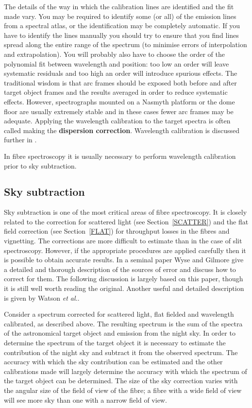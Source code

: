 \documentclass[twoside,11pt]{starlink}
\begin{document}
The details of the way in which the calibration lines are identified
and the fit made vary.  You may be required to identify some (or all)
of the emission lines from a spectral atlas, or the identification
may be completely automatic.  If you have to identify the lines
manually you should try to ensure that you find lines spread along
the entire range of the spectrum (to minimise errors of interpolation
and extrapolation).  You will probably also have to choose the order of
the polynomial fit between wavelength and position: too low an order
will leave systematic residuals and too high an order will introduce
spurious effects.  The traditional wisdom is that arc frames should be
exposed both before and after target object frames and the results averaged
in order to reduce systematic effects.  However, spectrographs mounted on
a Nasmyth platform or the dome floor are usually extremely stable and in
these cases fewer arc frames may be adequate.  Applying the wavelength
calibration to the target spectra is often called making the \textbf{dispersion
correction}.  Wavelength calibration is discussed further in .

In fibre spectroscopy it is usually necessary to perform wavelength
calibration prior to sky subtraction.

\subsection{\label{SKYSUB}Sky subtraction}

Sky subtraction is one of the most critical areas of fibre spectroscopy.
It is closely related to the correction for scattered light (see
Section~\ref{SCATTER}) and the flat field correction (see Section~\ref{FLAT})
for throughput losses in the fibres and vignetting.  The corrections
are more difficult to estimate than in the case of slit spectroscopy.
However, if the appropriate procedures are applied carefully then it is
possible to obtain accurate results.  In a seminal paper Wyse and
Gilmore\cite{WYSE92} give a detailed and thorough description of the
sources of error and discuss how to correct for them.  The following
discussion is largely based on this paper, though it is still well
worth reading the original.  Another useful and detailed description
is given by Watson \textit{et al.}\/\cite{WATSON98}.

Consider a spectrum corrected for scattered light, flat fielded and
wavelength calibrated, as described above.  The resulting spectrum is
the sum of the spectra of the astronomical target object and emission
from the night sky.  In order to determine the spectrum of the target
object it is necessary to estimate the contribution of the night sky and
subtract it from the observed spectrum.  The accuracy with which the sky
contribution can be estimated and the other calibrations made will largely
determine the accuracy with which the spectrum of the target object can be
determined.  The size of the sky correction varies with the angular size
of the field of view of the fibre; a fibre with a wide field of view will
see more sky than one with a narrow field of view.
\end{document}
